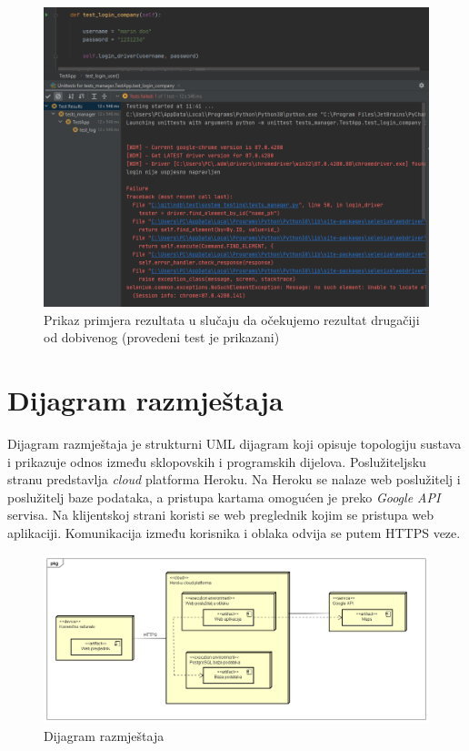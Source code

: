 			\begin{figure}[H]
				\includegraphics[scale=0.6]{slike/test_sistem_failedTest.png} %
				\centering
				\caption{Prikaz primjera rezultata u slučaju da očekujemo rezultat drugačiji od dobivenog (provedeni test je prikazani)}
				\label{fig:test - sistemski - neuspješno provedeni test}
			\end{figure}					
			
			\eject 
		
		
		\section{Dijagram razmještaja}
			 
			 Dijagram razmještaja je strukturni UML dijagram koji opisuje topologiju sustava i prikazuje odnos između sklopovskih i programskih dijelova. Poslužiteljsku stranu predstavlja \textit{cloud} platforma Heroku. Na Heroku se nalaze web poslužitelj i poslužitelj baze podataka, a pristupa kartama omogućen je preko \textit{Google API} servisa. Na klijentskoj strani koristi se web preglednik kojim se pristupa web aplikaciji. Komunikacija između korisnika i oblaka odvija se putem HTTPS veze.
			
			\begin{figure}[H]
				\includegraphics[scale=0.45]{dijagrami/dijagram_razmjestaja.png} %
				\centering
				\caption{Dijagram razmještaja}
				\label{fig:promjene}
			\end{figure}
			
